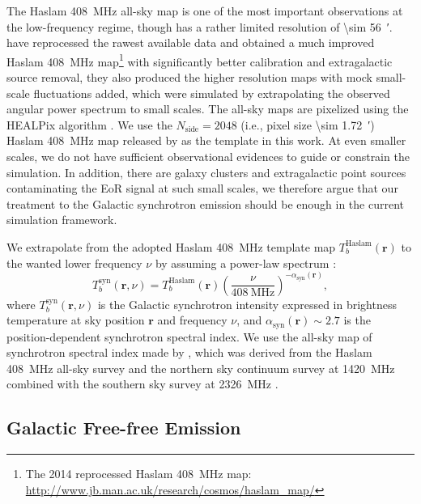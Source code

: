 \documentclass[modern]{aastex61}
\newcommand{\R}[1]{\mathrm{#1}}
\begin{document}
The Haslam \SI{408}{\MHz} all-sky map is one of the most important
observations at the low-frequency regime, though has a rather limited
resolution of \SI{\sim 56}{\arcmin}.
\citet{remazeilles2015} have reprocessed the rawest available data
and obtained a much improved Haslam \SI{408}{\MHz} map\footnote{%
  The 2014 reprocessed Haslam \SI{408}{\MHz} map:
  \url{http://www.jb.man.ac.uk/research/cosmos/haslam_map/}}
with significantly better calibration and extragalactic source removal,
they also produced the higher resolution maps with mock small-scale
fluctuations added, which were simulated by extrapolating the observed
angular power spectrum to small scales.
The all-sky maps are pixelized using the HEALPix algorithm \citep{gorski2005}.
We use the $N_{\R{side}} = 2048$ (i.e., pixel size \SI{\sim 1.72}{\arcmin})
Haslam \SI{408}{\MHz} map released by \citet{remazeilles2015} as the
template in this work.
At even smaller scales, we do not have sufficient observational
evidences to guide or constrain the simulation.  In addition, there
are galaxy clusters and extragalactic point sources contaminating
the EoR signal at such small scales, we therefore argue that our
treatment to the Galactic synchrotron emission should be enough in
the current simulation framework.

We extrapolate from the adopted Haslam \SI{408}{\MHz} template map
$T_b^{\R{Haslam}}(\bm{r})$ to the wanted lower frequency $\nu$ by assuming
a power-law spectrum \citep{wang2010,bonaldi2015}:
\begin{equation}
  \label{eq:gsync-extrap}
  T_b^{\R{syn}}(\bm{r}, \nu) = T_b^{\R{Haslam}}(\bm{r})
    \left( \frac{\nu}{\SI{408}{\MHz}} \right)^{-\alpha_{\R{syn}}(\bm{r})},
\end{equation}
where $T_b^{\R{syn}}(\bm{r}, \nu)$ is the Galactic synchrotron intensity
expressed in brightness temperature at sky position $\bm{r}$ and
frequency $\nu$,
\color{magenta}
and $\alpha_{\R{syn}}(\bm{r}) \sim 2.7$ is
the position-dependent synchrotron spectral index.
We use the all-sky map of synchrotron spectral index made by
\citet{giardino2002}, which was derived from the Haslam \SI{408}{\MHz}
all-sky survey and the northern sky continuum survey at \SI{1420}{\MHz}
\citep{reich1986} combined with the southern sky survey at
\SI{2326}{\MHz} \citep{jonas1998}.
\color{black}


\subsection{Galactic Free-free Emission}
\label{sec:fg-gfree}
\end{document}
